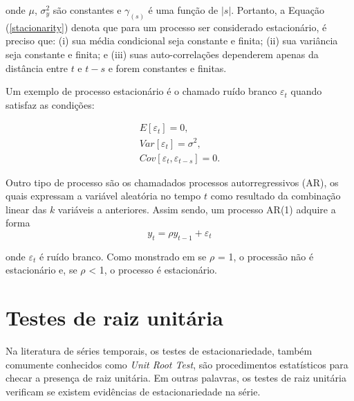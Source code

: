 \noindent onde $\mu$, $\sigma^2_y$ são constantes e $\gamma_{(s)}$ é uma função de $|s|$. Portanto, a Equação (\ref{stacionarity}) denota que para um processo ser considerado estacionário, é preciso que: (i) sua média condicional seja constante e finita; (ii) sua variância seja constante e finita; e (iii) suas auto-correlações dependerem apenas da distância entre $t$ e $t-s$ e forem constantes e finitas.

Um exemplo de processo estacionário é o chamado ruído branco $\varepsilon_t$ quando satisfaz as condições:

\begin{equation}\label{ruidobranco}
\begin{split}
    E[\varepsilon_t] = 0, \\
    Var[\varepsilon_t] = \sigma^2, \\
    Cov[\varepsilon_t, \varepsilon_{t-s}] = 0.
\end{split}
\end{equation}

Outro tipo de processo são os chamadados processos autorregressivos (AR), os quais expressam a variável aleatória no tempo $t$ como resultado da combinação linear das $k$ variáveis a anteriores. Assim sendo, um processo AR(1) adquire a forma 
\begin{equation}
    y_t = \rho y_{t-1} + \varepsilon_t
\end{equation}

\noindent onde $\varepsilon_t$ é ruído branco. Como monstrado em  se $\rho$ = 1, o processão não é estacionário e, se $\rho$ < 1, o processo é estacionário.

\section{Testes de raiz unitária}

Na literatura de séries temporais, os testes de estacionariedade, também comumente conhecidos como \textit{Unit Root Test}, são procedimentos estatísticos para checar a presença de raiz unitária. Em outras palavras, os testes de raiz unitária verificam se existem evidências de estacionariedade na série.



